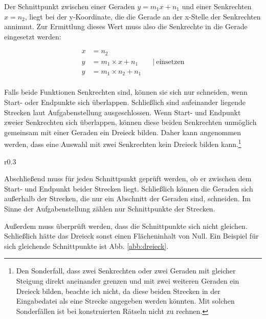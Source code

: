 Der Schnittpunkt zwischen einer Geraden \(y=m_1x+n_1\) und einer Senkrechten \(x=n_2\),
liegt bei der y-Koordinate, die die Gerade an der x-Stelle der Senkrechten annimmt.
Zur Ermittlung dieses Wert muss also die Senkrechte in die Gerade eingesetzt werden:

\begin{equation}
    \begin{aligned}
        x &= n_2                    \\
        y &= m_1 \times x + n_1 \qquad\vert\ \text{einsetzen}  \\
        y &= m_1 \times n_2 + n_1   \\
    \end{aligned}
    \label{eq:senkrechtschnitt}
\end{equation}

Falls beide Funktionen Senkrechten sind, können sie sich nur schneiden,
wenn Start- oder Endpunkte sich überlappen.
Schließlich sind aufeinander liegende Strecken laut Aufgabenstellung ausgeschlossen.
Wenn Start- und Endpunkt zweier Senkrechten sich überlappen,
können diese beiden Senkrechten unmöglich gemeinsam mit einer Geraden
ein Dreieck bilden. Daher kann angenommen werden, dass eine Auswahl mit zwei Senkrechten
kein Dreieck bilden kann.\footnote{Den Sonderfall, dass zwei Senkrechten oder zwei Geraden
mit gleicher Steigung direkt aneinander grenzen und mit zwei weiteren Geraden ein Dreieck
bilden, beachte ich nicht, da diese beiden Strecken in der Eingabedatei als eine Strecke
angegeben werden könnten. Mit solchen Sonderfällen ist bei konstruierten Rätseln nicht
zu rechnen.}

\begin{wrapfigure}{r}{0.3\textwidth}
    \begin{center}
    
    \end{center}
    \caption{Dreieck mit der Flächengröße 0}
    \label{abb:dreieck}
\end{wrapfigure}
Abschließend muss für jeden Schnittpunkt geprüft werden,
ob er zwischen dem Start- und Endpunkt beider Strecken liegt.
Schließlich können die Geraden sich außerhalb der Strecken,
die nur ein Abschnitt der Geraden sind, schneiden.
Im Sinne der Aufgabenstellung zählen nur Schnittpunkte der Strecken.

Außerdem muss überprüft werden, dass die Schnittpunkte sich nicht gleichen.
Schließlich hätte das Dreieck sonst einen Flächeninhalt von Null.
Ein Beispiel für sich gleichende Schnittpunkte ist Abb. \ref{abb:dreieck}.


